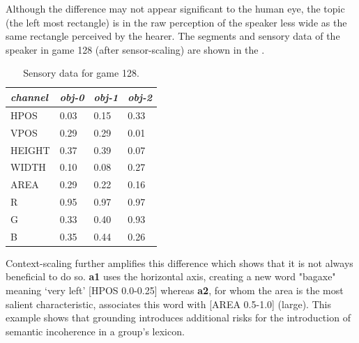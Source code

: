 Although the difference may not appear significant to 
the human eye, the topic (the left most rectangle) is 
in the raw perception of the speaker less wide as the same 
rectangle perceived by the hearer. 
The segments and sensory data of the speaker
in game 128 (after sensor-scaling) are shown in the 
. 
\begin{table}
\begin{center}
\begin{tabular}{| l | l | l | l |} \hline
{\it channel}& {\it obj-0} & {\it obj-1} & {\it obj-2}\\ \hline
HPOS & 0.03 & 0.15 & 0.33\\ \hline
VPOS & 0.29 & 0.29 & 0.01\\ \hline
HEIGHT & 0.37 & 0.39 & 0.07\\ \hline
WIDTH & 0.10 & 0.08 & 0.27\\ \hline
AREA & 0.29 & 0.22 & 0.16\\ \hline
R & 0.95 & 0.97 & 0.97 \\ \hline
G & 0.33 & 0.40 & 0.93\\ \hline
B & 0.35 & 0.44 & 0.26\\ \hline
\end{tabular}
\caption{ \label{tab:game128} Sensory data for game 128.}
\end{center}
\end{table}
Context-scaling further
amplifies this difference which shows that it is not 
always beneficial to do so. {\bf a1} uses
the horizontal axis, creating a new word "bagaxe" 
meaning `very left' [HPOS 0.0-0.25] whereas {\bf a2}, for
whom the area is the most salient characteristic, 
associates this word with [AREA 0.5-1.0] (large). 
This example shows that grounding introduces 
additional risks for the introduction of semantic
incoherence in a group's lexicon. 

